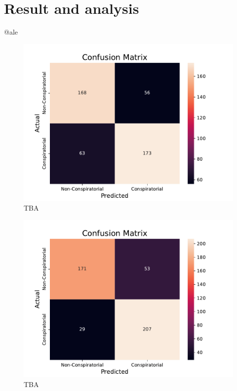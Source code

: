 \documentclass[11pt]{article}
\begin{document}
\section{Result and analysis}\label{sec:results-analysis}
@ale
\begin{figure}
  \centering
  \includegraphics[width=\columnwidth]{figures/decoder-only-confusion-matrix.pdf}
  \caption{
   TBA}
  \label{fig:decoder-only-cm}
\end{figure}

\begin{figure}
  \centering
  \includegraphics[width=\columnwidth]{figures/encoder-only-confusion-matrix.pdf}
  \caption{
   TBA}
  \label{fig:encoder-only-cm}
\end{figure}






\end{document}
